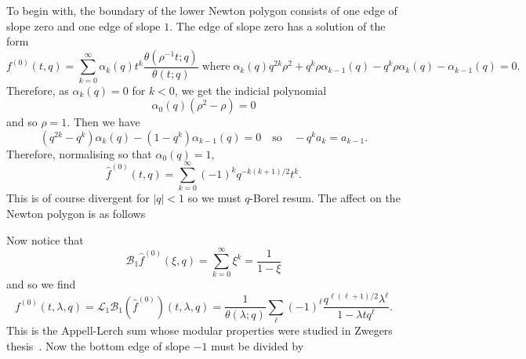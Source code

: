 \documentclass[12pt,reqno]{amsart}
\theoremstyle{definition}
\def\be{\begin{equation}}
\def\ee{\end{equation}}
\def\Bor{\mathcal{B}}
\def\rind{\rho}
\begin{document}
\noindent
To begin with, the boundary of the lower Newton polygon consists of one edge of
slope zero and one edge of slope $1$. The edge of slope zero has a solution of
the form
\be
f^{(0)}(t,q)=
\sum_{k=0}^{\infty}\alpha_{k}(q)t^{k}\frac{\theta(\rind^{-1}t;q)}{\theta(t;q)}
\;\text{where}\;
\alpha_{k}(q)q^{2k}\rind^{2}+q^{k}
\rind\alpha_{k-1}(q)-q^{k}\rind\alpha_{k}(q)-\alpha_{k-1}(q)
=0.
\ee
Therefore, as $\alpha_{k}(q)=0$ for $k<0$, we get the indicial polynomial
\be
\alpha_{0}(q)(\rind^{2}-\rind) = 0
\ee
and so $\rind=1$. Then we have
\be
(q^{2k}-q^{k})\alpha_{k}(q)-(1-q^k)\alpha_{k-1}(q)=0
\quad\text{so}\quad
-q^{k}a_{k}=a_{k-1}.
\ee
Therefore, normalising so that $\alpha_{0}(q)=1$,
\be
\hat{f}^{(0)}(t,q)=\sum_{k=0}^{\infty}(-1)^{k}q^{-k(k+1)/2}t^{k}.
\ee
This is of course divergent for $|q|<1$ so we must $q$-Borel resum. The affect on
the Newton polygon is as follows
\begin{center}
\end{center}
Now notice that
\be
\Bor_{1}{\hat{f}^{(0)}}(\xi,q) = \sum_{k=0}^{\infty}\xi^{k}
= \frac{1}{1-\xi}
\ee
and so we find
\be
\label{ex2.f0}
f^{(0)}(t,\lambda ,q)
=
\mathcal{L}_{1}\mathcal{B}_{1}(\hat{f}^{(0)})(t,\lambda ,q)
=
\frac{1}{\theta(\lambda ;q)}\sum_{\ell}(-1)^{\ell}
\frac{q^{\ell(\ell+1)/2}\lambda ^{\ell}}{1-\lambda tq^{\ell}}.
\ee
This is the Appell-Lerch sum whose modular properties were studied in Zwegers
thesis~\cite{Zwegersthesis}. Now the bottom edge of slope $-1$ must be divided by
\end{document}
